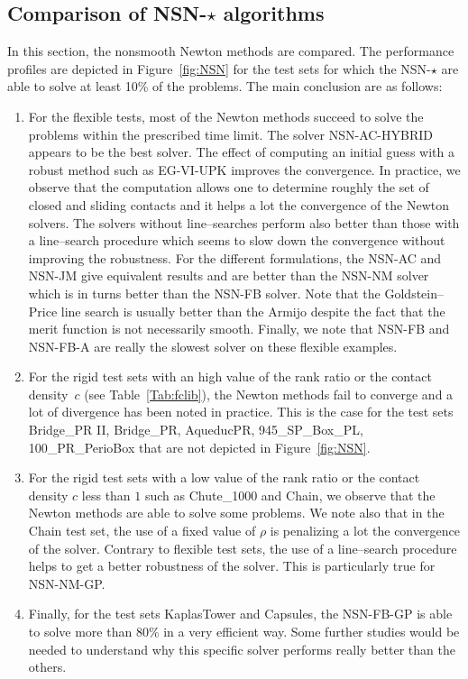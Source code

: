 \subsection{Comparison of {\sf NSN-$\star$} algorithms}

In this section,  the nonsmooth Newton methods  are compared.  The performance profiles are depicted in Figure~\ref{fig:NSN} for the test sets for which the {\sf NSN-$\star$} are able to solve at least 10\% of the problems. The main conclusion are as follows:
\begin{enumerate}
\item For the flexible tests, most of the Newton methods succeed to solve the problems within the prescribed time limit. The solver {\sf NSN-AC-HYBRID} appears to be the best solver.  The effect of computing an initial guess with a robust method such as {\sf EG-VI-UPK}  improves the convergence. In practice, we observe that the computation allows one to determine roughly the set of closed and sliding contacts and it helps a lot the convergence of the Newton solvers. The solvers without line--searches perform also better than those with a line--search procedure which  seems to slow down the convergence without improving the robustness.  For the different formulations, the {\sf NSN-AC} and {\sf NSN-JM} give equivalent results and are better than the {\sf NSN-NM} solver which is in turns better than the {\sf NSN-FB} solver. Note that the Goldstein--Price line search is usually better than the Armijo despite the fact that the merit function is not necessarily smooth. Finally, we note that  {\sf NSN-FB}  and {\sf NSN-FB-A} are really the slowest solver on these flexible examples.
\item For the rigid test sets with an high value of the rank ratio or the contact density~$c$ (see Table~\ref{Tab:fclib}), the Newton methods fail to converge and a lot of divergence has been noted in practice. This is the case for the test sets Bridge\_PR II, Bridge\_PR, AqueducPR, 945\_SP\_Box\_PL, 100\_PR\_PerioBox that are not depicted in Figure~\ref{fig:NSN}.
\item For the rigid test sets with a low value of the rank ratio or the contact density $c$ less than $1$ such as Chute\_1000 and Chain, we observe that the Newton methods are able to solve some problems. We note also that in the Chain test set, the use of a fixed value of $\rho$ is penalizing a lot the convergence of the solver. Contrary to flexible test sets, the use of a line--search procedure helps  to get a better robustness  of the solver. This is particularly true for {\sf NSN-NM-GP}.
\item Finally, for the test sets KaplasTower and Capsules, the {\sf NSN-FB-GP} is able to solve more than 80\% in a very efficient way. Some further studies would be needed to understand why this specific solver performs really better than the others.
\end{enumerate}

